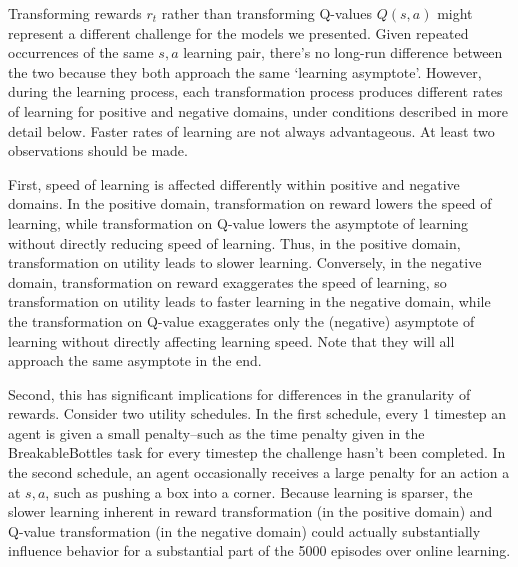 
Transforming rewards $r_t$ rather than transforming Q-values $Q(s, a)$ might represent a different challenge for the models we presented. Given repeated occurrences of the same $s, a$ learning pair, there's no long-run difference between the two because they both approach the same `learning asymptote'. However, during the learning process, each transformation process produces different rates of learning for positive and negative domains, under conditions described in more detail below. Faster rates of learning are not always advantageous. At least two observations should be made.



First, speed of learning is affected differently within positive and negative domains. In the positive domain, transformation on reward lowers the speed of learning, while transformation on Q-value lowers the asymptote of learning without directly reducing speed of learning. Thus, in the positive domain, transformation on utility leads to slower learning. Conversely, in the negative domain, transformation on reward exaggerates the speed of learning, so transformation on utility leads to faster learning in the negative domain, while the transformation on Q-value exaggerates only the (negative) asymptote of learning without directly affecting learning speed.  Note that they will all approach the same asymptote in the end.

Second, this has significant implications for differences in the granularity of rewards. Consider two utility schedules. In the first schedule, every 1 timestep an agent is given a small penalty--such as the time penalty given in the BreakableBottles task for every timestep the challenge hasn't been completed. In the second schedule, an agent occasionally receives a large penalty for an action a at $s, a$, such as pushing a box into a corner. Because learning is sparser, the slower learning inherent in reward transformation (in the positive domain) and Q-value transformation (in the negative domain) could actually substantially influence behavior for a substantial part of the 5000 episodes over online learning.

